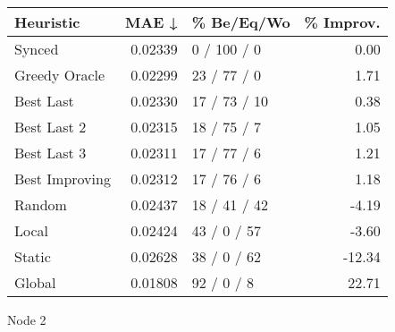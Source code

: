 \begin{tabular}{lrlr}
\toprule
\textbf{Heuristic} & \textbf{MAE ↓} & \textbf{\% Be/Eq/Wo} & \textbf{\% Improv.} \\
\midrule
            Synced &        0.02339 &          0 / 100 / 0 &                0.00 \\
     Greedy Oracle &        0.02299 &          23 / 77 / 0 &                1.71 \\
         Best Last &        0.02330 &         17 / 73 / 10 &                0.38 \\
       Best Last 2 &        0.02315 &          18 / 75 / 7 &                1.05 \\
       Best Last 3 &        0.02311 &          17 / 77 / 6 &                1.21 \\
    Best Improving &        0.02312 &          17 / 76 / 6 &                1.18 \\
            Random &        0.02437 &         18 / 41 / 42 &               -4.19 \\
             Local &        0.02424 &          43 / 0 / 57 &               -3.60 \\
            Static &        0.02628 &          38 / 0 / 62 &              -12.34 \\
            Global &        0.01808 &           92 / 0 / 8 &               22.71 \\
\bottomrule
\end{tabular}
\caption{Node 2}
\label{tab:iid_lr05_le1_bs4_2}
